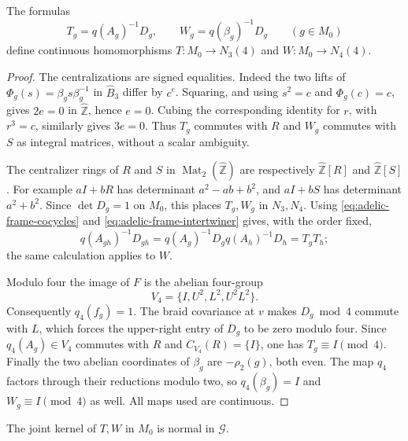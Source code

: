 \begin{lemma}\label{lem:adelic-corrected-frames}
The formulas
\begin{equation}
 T_g=q(A_g)^{-1}D_g,\qquad
 W_g=q(\beta_g)^{-1}D_g\qquad(g\in M_0)
 \label{eq:adelic-corrected-frames}
\end{equation}
define continuous homomorphisms
$T:M_0\to N_3(4)$ and $W:M_0\to N_4(4)$.
\end{lemma}

\begin{proof}
The centralizations are signed equalities.  Indeed the two lifts of
$\Phi_g(s)=\beta_gs\beta_g^{-1}$ in $\widehat B_3$ differ by
$c^e$.  Squaring, and using $s^2=c$ and $\Phi_g(c)=c$, gives
$2e=0$ in $\widehat{\mathbb Z}$, hence $e=0$.  Cubing the
corresponding identity for $r$, with $r^3=c$, similarly gives
$3e=0$.  Thus $T_g$ commutes with $R$ and $W_g$ commutes with $S$
as integral matrices, without a scalar ambiguity.

The centralizer rings of $R$ and $S$ in
$\operatorname{Mat}_2(\widehat{\mathbb Z})$ are respectively
$\widehat{\mathbb Z}[R]$ and $\widehat{\mathbb Z}[S]$.
For example $aI+bR$ has determinant $a^2-ab+b^2$, and
$aI+bS$ has determinant $a^2+b^2$.  Since $\det D_g=1$ on
$M_0$, this places $T_g,W_g$ in $N_3,N_4$.
Using \eqref{eq:adelic-frame-cocycles} and
\eqref{eq:adelic-frame-intertwiner} gives, with the order fixed,
\[
 q(A_{gh})^{-1}D_{gh}
 =q(A_g)^{-1}D_gq(A_h)^{-1}D_h=T_gT_h;
\]
the same calculation applies to $W$.

Modulo four the image of $F$ is the abelian four-group
\[
 V_4=\{I,U^2,L^2,U^2L^2\}.
\]
Consequently $q_4(f_g)=1$.  The braid covariance at $v$ makes
$D_g\bmod4$ commute with $L$, which forces the upper-right entry
of $D_g$ to be zero modulo four.  Since $q_4(A_g)\in V_4$
commutes with $R$ and $C_{V_4}(R)=\{I\}$, one has
$T_g\equiv I\pmod4$.  Finally the two abelian coordinates of
$\beta_g$ are $-\rho_2(g)$, both even.  The map $q_4$ factors
through their reductions modulo two, so $q_4(\beta_g)=I$ and
$W_g\equiv I\pmod4$ as well.  All maps used are continuous.
\end{proof}

\begin{lemma}\label{lem:adelic-kernel-normality}
The joint kernel of $T,W$ in $M_0$ is normal in $\mathcal G$.
\end{lemma}


